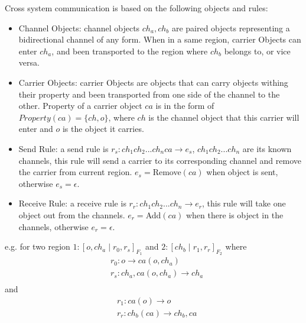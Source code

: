\documentclass[9pt,a4paper,twoside]{article}
\begin{document}
            Cross system communication is based on the following objects and rules:
            \begin{itemize}
                \item Channel Objects: channel objects $ch_a, ch_b$ are paired objects representing a bidirectional channel of any form. When in a same region, carrier Objects can enter $ch_a$, and been transported to the region where $ch_b$ belongs to, or vice versa.
                \item Carrier Objects: carrier Objects are objects that can carry objects withing their property and been transported from one side of the channel to the other. Property of a carrier object $ca$ is in the form of $Property(ca)=\{ ch, o\}$, where $ch$ is the channel object that this carrier will enter and $o$ is the object it carries.
                \item Send Rule: a send rule is $r_s: ch_1ch_2...ch_nca \rightarrow e_s$, $ch_1ch_2...ch_n$ are its known channels, this rule will send a carrier to its corresponding channel and remove the carrier from current region. $e_s = $Remove$(ca)$ when object is sent, otherwise $e_s=\epsilon$. 
                \item Receive Rule: a receive rule is $r_r: ch_1ch_2...ch_n \rightarrow e_r$, this rule will take one object out from the channels. $e_r = $Add$(ca)$ when there is object in the channels, otherwise $e_r=\epsilon$. 
            \end{itemize}

            e.g. for two region $1:[o,ch_a \mid r_0,r_s]_{F_1}$ and $2:[ ch_b \mid r_1,r_r]_{F_2}$
            where
            \begin{equation}
                \begin{align}
                    &r_0: o \rightarrow ca(o,ch_a) \\
                    &r_s: ch_a,ca(o,ch_a) \rightarrow ch_a \\
                \end{align}
            \end{equation}
            and 
            \begin{equation}
             \begin{align}
                    &r_1: ca(o) \rightarrow o \\
                    &r_r: ch_b(ca) \rightarrow ch_b,ca\\
                \end{align}
            \end{equation}
\end{document}
